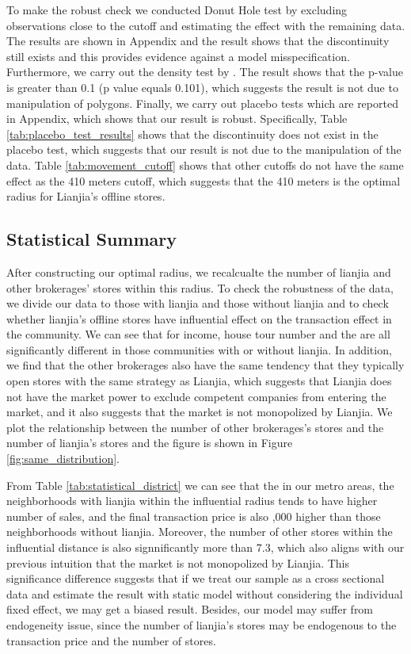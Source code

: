 \documentclass[11pt]{article}
\begin{document}
To make the robust check we conducted Donut Hole test by excluding observations close to the cutoff and estimating the effect with the remaining data. The results are shown in Appendix and the result shows that the discontinuity still exists and this provides evidence against a model misspecification. Furthermore, we carry out the density test by \citep{MCCRARY2008698}. The result shows that the p-value is greater than 0.1 (p value equals 0.101), which suggests the result is not due to manipulation of polygons. Finally, we carry out placebo tests which are reported in Appendix, which shows that our result is robust. Specifically, Table \ref{tab:placebo_test_results} shows that the discontinuity does not exist in the placebo test, which suggests that our result is not due to the manipulation of the data. Table \ref{tab:movement_cutoff} shows that other cutoffs do not have the same effect as the 410 meters cutoff, which suggests that the 410 meters is the optimal radius for Lianjia's offline stores.

\subsection{Statistical Summary} \label{subsec:Statistical_Summary}

After constructing our optimal radius, we recalcualte the number of lianjia and other brokerages' stores within this radius. To check the robustness of the data, we divide our data to those with lianjia and those without lianjia and to check whether lianjia's offline stores have influential effect on the transaction effect in the community. We can see that for income, house tour number and the are all significantly different in those communities with or without lianjia. In addition, we find that the other brokerages also have the same tendency that they typically open stores with the same strategy as Lianjia, which suggests that Lianjia does not have the market power to exclude competent companies from entering the market, and it also suggests that the market is not monopolized by Lianjia. We plot the relationship between the number of other brokerages's stores and the number of lianjia's stores and the figure is shown in Figure \ref{fig:same_distribution}.

From Table \ref{tab:statistical_district} we can see that the in our metro areas, the neighborhoods with lianjia within the influential radius tends to have higher number of sales, and the final transaction price is also ,000 higher than those neighborhoods without lianjia. Moreover, the number of other stores within the influential distance is also signnificantly more than 7.3, which also aligns with our previous intuition that the market is not monopolized by Lianjia. This significance difference suggests that if we treat our sample as a cross sectional data and estimate the result with static model without considering the individual fixed effect, we may get a biased result. Besides, our model may suffer from endogeneity issue, since the number of lianjia's stores may be endogenous to the transaction price and the number of stores. 
\end{document}
